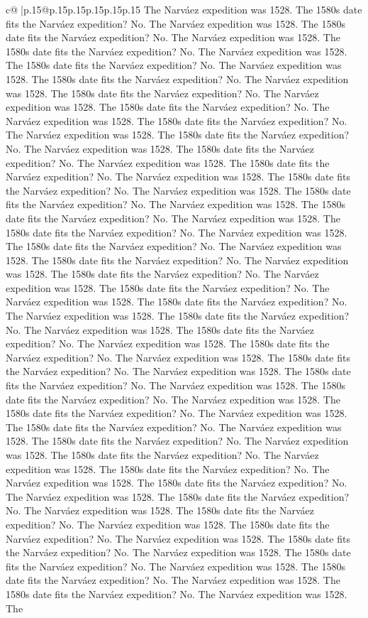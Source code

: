\documentclass{article}
\begin{document}
{\begin{supertabular}{c@{$\;$}|p{.15\linewidth}@{}p{.15\linewidth}p{.15\linewidth}p{.15\linewidth}p{.15\linewidth}p{.15\linewidth}}
{{{The Narváez expedition was 1528. The 1580s date fits the Narváez expedition? No. The Narváez expedition was 1528. The 1580s date fits the Narváez expedition? No. The Narváez expedition was 1528. The 1580s date fits the Narváez expedition? No. The Narváez expedition was 1528. The 1580s date fits the Narváez expedition? No. The Narváez expedition was 1528. The 1580s date fits the Narváez expedition? No. The Narváez expedition was 1528. The 1580s date fits the Narváez expedition? No. The Narváez expedition was 1528. The 1580s date fits the Narváez expedition? No. The Narváez expedition was 1528. The 1580s date fits the Narváez expedition? No. The Narváez expedition was 1528. The 1580s date fits the Narváez expedition? No. The Narváez expedition was 1528. The 1580s date fits the Narváez expedition? No. The Narváez expedition was 1528. The 1580s date fits the Narváez expedition? No. The Narváez expedition was 1528. The 1580s date fits the Narváez expedition? No. The Narváez expedition was 1528. The 1580s date fits the Narváez expedition? No. The Narváez expedition was 1528. The 1580s date fits the Narváez expedition? No. The Narváez expedition was 1528. The 1580s date fits the Narváez expedition? No. The Narváez expedition was 1528. The 1580s date fits the Narváez expedition? No. The Narváez expedition was 1528. The 1580s date fits the Narváez expedition? No. The Narváez expedition was 1528. The 1580s date fits the Narváez expedition? No. The Narváez expedition was 1528. The 1580s date fits the Narváez expedition? No. The Narváez expedition was 1528. The 1580s date fits the Narváez expedition? No. The Narváez expedition was 1528. The 1580s date fits the Narváez expedition? No. The Narváez expedition was 1528. The 1580s date fits the Narváez expedition? No. The Narváez expedition was 1528. The 1580s date fits the Narváez expedition? No. The Narváez expedition was 1528. The 1580s date fits the Narváez expedition? No. The Narváez expedition was 1528. The 1580s date fits the Narváez expedition? No. The Narváez expedition was 1528. The 1580s date fits the Narváez expedition? No. The Narváez expedition was 1528. The 1580s date fits the Narváez expedition? No. The Narváez expedition was 1528. The 1580s date fits the Narváez expedition? No. The Narváez expedition was 1528. The 1580s date fits the Narváez expedition? No. The Narváez expedition was 1528. The 1580s date fits the Narváez expedition? No. The Narváez expedition was 1528. The 1580s date fits the Narváez expedition? No. The Narváez expedition was 1528. The 1580s date fits the Narváez expedition? No. The Narváez expedition was 1528. The 1580s date fits the Narváez expedition? No. The Narváez expedition was 1528. The 1580s date fits the Narváez expedition? No. The Narváez expedition was 1528. The 1580s date fits the Narváez expedition? No. The Narváez expedition was 1528. The 1580s date fits the Narváez expedition? No. The Narváez expedition was 1528. The 1580s date fits the Narváez expedition? No. The Narváez expedition was 1528. The 1580s date fits the Narváez expedition? No. The Narváez expedition was 1528. The 1580s date fits the Narváez expedition? No. The Narváez expedition was 1528. The }}}
\end{supertabular}}
\end{document}
